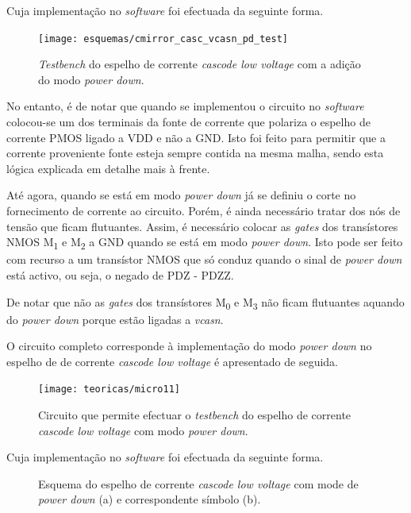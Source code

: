 \documentclass[11pt]{article}
\numberwithin{equation}{section}
\begin{document}
Cuja implementação no \textit{software} foi efectuada da seguinte forma.

\begin{figure}[H]
	\centering
	\texttt{[image: esquemas/cmirror\_casc\_vcasn\_pd\_test]}
	\vspace{-0.8em}
	\caption{\textit{Testbench} do espelho de corrente \textit{cascode low voltage} com a adição do modo \textit{power down}.}
	\vspace{-0.8em}
\end{figure}

No entanto, é de notar que quando se implementou o circuito no \textit{software} colocou-se um dos terminais da fonte de corrente que polariza o espelho de corrente PMOS ligado a VDD e não a GND. Isto foi feito para permitir que a corrente proveniente fonte esteja sempre contida na mesma malha, sendo esta lógica explicada em detalhe mais à frente.

Até agora, quando se está em modo \textit{power down} já se definiu o corte no fornecimento de corrente ao circuito. Porém, é ainda necessário tratar dos nós de tensão que ficam flutuantes. Assim, é necessário colocar as \textit{gates} dos transístores NMOS M\textsubscript{1} e M\textsubscript{2} a GND quando se está em modo \textit{power down}. Isto pode ser feito com recurso a um transístor NMOS que só conduz quando o sinal de \textit{power down} está activo, ou seja, o negado de PDZ - PDZZ. 

De notar que não as \textit{gates} dos transístores M\textsubscript{0} e M\textsubscript{3} não ficam flutuantes aquando do \textit{power down} porque estão ligadas a \textit{vcasn}.

O circuito completo corresponde à implementação do modo \textit{power down} no espelho de de corrente \textit{cascode low voltage} é apresentado de seguida.

\begin{figure}[H]
	\centering
	\texttt{[image: teoricas/micro11]}
	\vspace{-0.8em}
	\caption{Circuito que permite efectuar o \textit{testbench} do espelho de corrente \textit{cascode low voltage} com modo \textit{power down}.}
	\vspace{-0.8em}
\end{figure}

Cuja implementação no \textit{software} foi efectuada da seguinte forma.

\begin{figure}[H]
	\centering
	\hspace{2mm}
	\vspace{-0.8em}
	\caption{Esquema do espelho de corrente \textit{cascode low voltage} com mode de \textit{power down} (a) e correspondente símbolo (b).}
	\vspace{-0.8em}
\end{figure}
\end{document}
